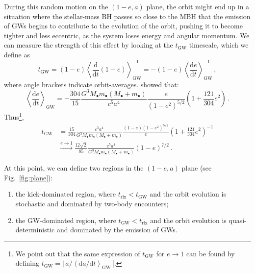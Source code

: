 \documentclass[desactivate]{aa}
\begin{document}
        During this random motion on the $(1-e, a)$ plane, the orbit might end up in a situation where the stellar-mass BH passes so close to the MBH that the emission of GWs begins to contribute to the evolution of the orbit, pushing it to become tighter and less eccentric, as the system loses energy and angular momentum. We can measure the strength of this effect by looking at the $t_\mathrm{GW}$ timescale, which we define as
        \begin{equation}
            t_\mathrm{GW} = (1-e) \left\langle \frac{\mathrm{d}}{\mathrm{d}t } \left( 1-e \right) \right\rangle^{-1}_\mathrm{GW} = - \left( 1-e \right) \left\langle \frac{\mathrm{d}e}{\mathrm{d}t } \right\rangle^{-1}_\mathrm{GW} \, ,
        \end{equation}
        where angle brackets indicate orbit-averages. \citet{1964PhRv..136.1224P} showed that:
        \begin{equation}
            \left\langle \frac{\mathrm{d}e}{\mathrm{d}t } \right\rangle_\mathrm{GW} = - \frac{304}{15} \frac{G^3 M_\bullet m_\bullet (M_\bullet+m_\bullet)}{c^5 a^4} \frac{e}{(1-e^2)^{5/2}}\left( 1+\frac{121}{304} e^2 \right) \, .
        \end{equation}
        Thus\footnote{We point out that the same expression of $t_\mathrm{GW}$ for $e \to 1$ can be found by defining $t_\mathrm{GW} = | \,a / \left\langle \mathrm{d}a/\mathrm{d}t  \right\rangle_\mathrm{GW}$\,|.},
        \begin{equation} \label{eq:t_gw}
            \begin{aligned}
                t_\mathrm{GW} &= \frac{15}{304} \frac{c^5 a^4}{G^3 M_\bullet m_\bullet (M_\bullet+m_\bullet)} \frac{(1-e)(1-e^2)^{5/2}}{e} \left( 1+\frac{121}{304} e^2 \right)^{-1} \\
                & \xrightarrow{e \to 1} \frac{12 \sqrt{2}}{85} \frac{c^5 a^4}{G^3 M_\bullet m_\bullet (M_\bullet+m_\bullet)} (1-e)^{7/2} \, .
            \end{aligned}
        \end{equation}

        At this point, we can define two regions in the $(1-e,a)$ plane (see Fig.\ \ref{fig:plane}):
        \begin{enumerate}
            \item the kick-dominated region, where $t_\mathrm{rlx} < t_\mathrm{GW}$ and the orbit evolution is stochastic and dominated by two-body encounters;
            \item the GW-dominated region, where $t_\mathrm{GW} < t_\mathrm{rlx}$ and the orbit evolution is quasi-deterministic and dominated by the emission of GWs.
        \end{enumerate}
        
\end{document}
